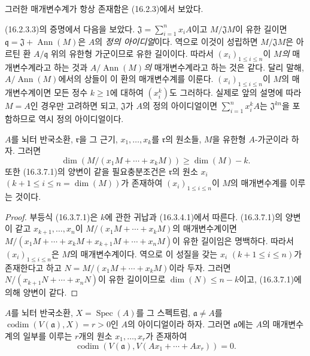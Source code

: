 그러한 매개변수계가 항상 존재함은 (16.2.3)에서 보았다.

(16.2.3.3)의 증명에서 다음을 보았다.
$\mathfrak{J}=\sum_{i=1}^n x_iA$이고 $M/\mathfrak{J}M$이 유한
길이면 $\mathfrak{q}=\mathfrak{J}+\operatorname{Ann}(M)$은
$A$의 \emph{정의 아이디얼}이다. 역으로 이것이 성립하면
$M/\mathfrak{J}M$은 아르틴 환 $A/\mathfrak{q}$ 위의 유한형
가군이므로 유한 길이이다. 따라서 $(x_i)_{1\leq i\leq n}$이
\emph{$M$의} 매개변수계라고 하는 것과
\emph{$A/\operatorname{Ann}(M)$의} 매개변수계라고 하는 것은 같다.
달리 말해, $A/\operatorname{Ann}(M)$에서의 상들이 이 환의
매개변수계를 이룬다. $(x_i)_{1\leq i\leq n}$이 $M$의
매개변수계이면 모든 정수 $k\geq1$에 대하여 $(x_i^k)$도 그러하다.
실제로 앞의 설명에 따라 $M=A$인 경우만 고려하면 되고,
$\mathfrak{J}$가 $A$의 정의 아이디얼이면
$\sum_{i=1}^n x_i^kA$는 $\mathfrak{J}^{kn}$을 포함하므로 역시 정의
아이디얼이다.

\begin{proposition}[16.3.7]
\label{0.16.3.7-fr}
$A$를 뇌터 반국소환, $\mathfrak{r}$을 그 근기,
$x_1,\ldots,x_k$를 $\mathfrak{r}$의 원소들, $M$을 유한형
$A$-가군이라 하자. 그러면
\begin{equation}
\label{0.16.3.7.1-fr}
\tag{16.3.7.1}
  \dim(M/(x_1M+\cdots+x_kM))\geq\dim(M)-k.
\end{equation}
또한 (16.3.7.1)의 양변이 같을 필요충분조건은
$\mathfrak{r}$의 원소 $x_i$ $(k+1\leq i\leq n=\dim(M))$가 존재하여
$(x_i)_{1\leq i\leq n}$이 $M$의 매개변수계를 이루는 것이다.
\end{proposition}

\begin{proof}
부등식 (16.3.7.1)은 $k$에 관한 귀납과 (16.3.4.1)에서 따른다.
(16.3.7.1)의 양변이 같고 $x_{k+1},\ldots,x_n$이
$M/(x_1M+\cdots+x_kM)$의 매개변수계이면
$M/(x_1M+\cdots+x_kM+x_{k+1}M+\cdots+x_nM)$이 유한 길이임은
명백하다. 따라서 $(x_i)_{1\leq i\leq n}$은 $M$의 매개변수계이다.
역으로 이 성질을 갖는 $x_i$ $(k+1\leq i\leq n)$가 존재한다고 하고
$N=M/(x_1M+\cdots+x_kM)$이라 두자. 그러면
$N/(x_{k+1}N+\cdots+x_nN)$이 유한 길이이므로
$\dim(N)\leq n-k$이고, (16.3.7.1)에 의해 양변이 같다.
\end{proof}


\begin{proposition}[16.3.8]
\label{0.16.3.8-fr}
$A$를 뇌터 반국소환, $X=\operatorname{Spec}(A)$를 그 스펙트럼,
$\mathfrak{a}\neq A$를
$\operatorname{codim}(V(\mathfrak{a}),X)=r>0$인 $A$의
아이디얼이라 하자. 그러면 $\mathfrak{a}$에는 $A$의 매개변수계의
일부를 이루는 $r$개의 원소 $x_1,\ldots,x_r$가 존재하여
\[
  \operatorname{codim}(V(\mathfrak{a}),
  V(Ax_1+\cdots+Ax_r))=0.
\]
\end{proposition}

